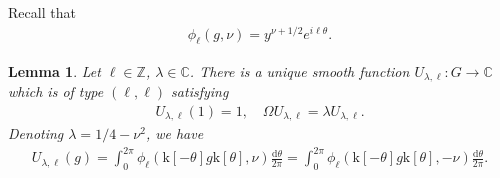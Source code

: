 \documentclass[12pt]{amsart}
\newtheorem{lemma}[theorem]{Lemma}
\theoremstyle{definition}
\theoremstyle{remark}
\numberwithin{equation}{section}
\newcommand{\C}{{\mathbb C}}
\newcommand{\Z}{{\mathbb Z}}
\newcommand{\1}{{\mathbf 1}}
\renewcommand{\d}{\mathrm d}
\begin{document}
Recall that
\begin{align*}
    \phi_{\ell}(g,\nu) = y^{\nu+1/2} e^{i\ell \theta}.
\end{align*}
\begin{lemma} \label{le:Uunique}
 Let $\ell \in \Z$, $\lambda \in \C$. There is a unique smooth function $U_{\lambda,\ell}:G \to \C$ which is of type $(\ell,\ell)$ satisfying
 \begin{align*}
  U_{\lambda,\ell}(1) = 1, \quad  \Omega U_{\lambda,\ell} = \lambda U_{\lambda,\ell}.
 \end{align*}
Denoting $\lambda = 1/4-\nu^2$, we have
 \begin{align}  \label{eq:Uformula}
   U_{\lambda,\ell}(g)  =  \int_0^{2\pi} \phi_\ell(\mathrm{k}[-\theta]g\mathrm{k}[\theta],\nu)  \frac{\d \theta}{2\pi}= \int_0^{2\pi} \phi_\ell(\mathrm{k}[-\theta]g\mathrm{k}[\theta],-\nu) \frac{\d \theta}{2\pi}.
 \end{align}
\end{lemma}
\end{document}
